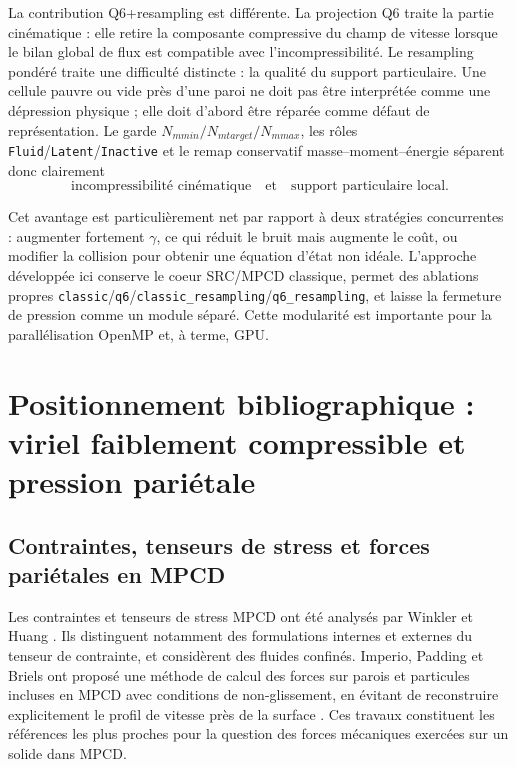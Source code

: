 \documentclass[11pt,a4paper]{article}
\begin{document}
La contribution Q6+resampling est différente. La projection Q6 traite la partie cinématique : elle retire la composante compressive du champ de vitesse lorsque le bilan global de flux est compatible avec l'incompressibilité. Le resampling pondéré traite une difficulté distincte : la qualité du support particulaire. Une cellule pauvre ou vide près d'une paroi ne doit pas être interprétée comme une dépression physique ; elle doit d'abord être réparée comme défaut de représentation. Le garde \(N_{
m min}/N_{
m target}/N_{
m max}\), les rôles \texttt{Fluid}/\texttt{Latent}/\texttt{Inactive} et le remap conservatif masse--moment--énergie séparent donc clairement
\begin{equation}
  \text{incompressibilité cinématique}
  \quad \text{et} \quad
  \text{support particulaire local}.
\end{equation}

Cet avantage est particulièrement net par rapport à deux stratégies concurrentes : augmenter fortement \(\gamma\), ce qui réduit le bruit mais augmente le coût, ou modifier la collision pour obtenir une équation d'état non idéale. L'approche développée ici conserve le coeur SRC/MPCD classique, permet des ablations propres \texttt{classic}/\texttt{q6}/\texttt{classic\_resampling}/\texttt{q6\_resampling}, et laisse la fermeture de pression comme un module séparé. Cette modularité est importante pour la parallélisation OpenMP et, à terme, GPU.

\section{Positionnement bibliographique : viriel faiblement compressible et pression pariétale}

\subsection{Contraintes, tenseurs de stress et forces pariétales en MPCD}

Les contraintes et tenseurs de stress MPCD ont été analysés par Winkler et Huang \cite{WinklerHuang2009}. Ils distinguent notamment des formulations internes et externes du tenseur de contrainte, et considèrent des fluides confinés. Imperio, Padding et Briels ont proposé une méthode de calcul des forces sur parois et particules incluses en MPCD avec conditions de non-glissement, en évitant de reconstruire explicitement le profil de vitesse près de la surface \cite{ImperioPaddingBriels2011}. Ces travaux constituent les références les plus proches pour la question des forces mécaniques exercées sur un solide dans MPCD.
\end{document}

